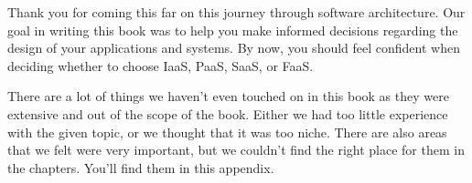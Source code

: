Thank you for coming this far on this journey through software architecture. Our goal in writing this book was to help you make informed decisions regarding the design of your applications and systems. By now, you should feel confident when deciding whether to choose IaaS, PaaS, SaaS, or FaaS.

There are a lot of things we haven't even touched on in this book as they were extensive and out of the scope of the book. Either we had too little experience with the given topic, or we thought that it was too niche. There are also areas that we felt were very important, but we couldn't find the right place for them in the chapters. You'll find them in this appendix.